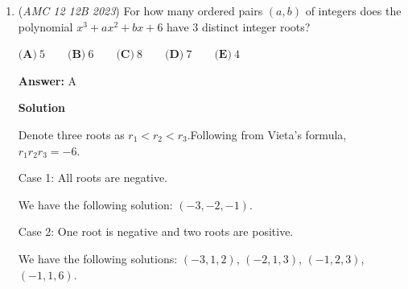 \begin{enumerate}
\textbf{Solution 3 (Newton's Sums)}

Same formal process of Solution 2, once we have $4x^3 - 13x^2 + 11x - 2$. Let $s_{2} = a^2 + b^2 + c^2$ and $s_{1} = a + b + c = \frac{13}{4}$. Applying \href{https://artofproblemsolving.com/wiki/index.php/Newton's\_Sums}{Newton's Sums}, we have 
 \[(4)s_{2} + (-13)s_{1} + 2 * 11 = 0\]. We can solve that $s_{2} = \frac{81}{16}$, and the interior diagonal would be 
 \[\sqrt{s_{2}} = \frac{9}{4}\].

 



\textbf{Solution 4 (Cheese Method)}

Incorporating the solution above, we know $a+b+c$ = $13/4$ $\Rightarrow$ $a+b+c > 3$. The side lengths are larger than $1$ $\cdot$ $1$ $\cdot$ $1$ (a unit cube). The side length of the interior of a unit cube is $\sqrt{3}$, and we know that the side lengths are larger than $1$ $\cdot$ $1$ $\cdot$ $1$, so that means the diagonal has to be larger than $\sqrt{3}$, and the only answer choice larger than $\sqrt{3}$ $\Rightarrow$ $\boxed{\textbf{(D)}~\frac94}$

 Note that the real number $\sqrt{3}$ is around $1.73$. Option $A$ is also greater than $\sqrt{3}$ meaning there are two options greater than $\sqrt{3}$. Option $A$ is an integer so educationally guessing we arrive at answer $D$ $\Rightarrow$ $\boxed{\textbf{(D)}~\frac94}$



	\item (\textit{AMC 12 12B 2023}) For how many ordered pairs $(a,b)$ of integers does the polynomial $x^3+ax^2+bx+6$ have $3$ distinct integer roots?


 $\textbf{(A)}\ 5 \qquad\textbf{(B)}\ 6 \qquad\textbf{(C)}\ 8 \qquad\textbf{(D)}\ 7 \qquad\textbf{(E)}\ 4$

 \textbf{Answer: }A



\textbf{Solution}

Denote three roots as $r_1 < r_2 < r_3$.Following from Vieta's formula, $r_1r_2r_3 = -6$.

 Case 1: All roots are negative.

 We have the following solution: $\left( -3, -2, -1 \right)$.

 Case 2: One root is negative and two roots are positive.

 We have the following solutions: $\left( -3, 1, 2 \right)$, $\left( -2, 1, 3 \right)$, $\left( -1, 2, 3 \right)$, $\left( -1, 1, 6 \right)$.


\end{enumerate}
